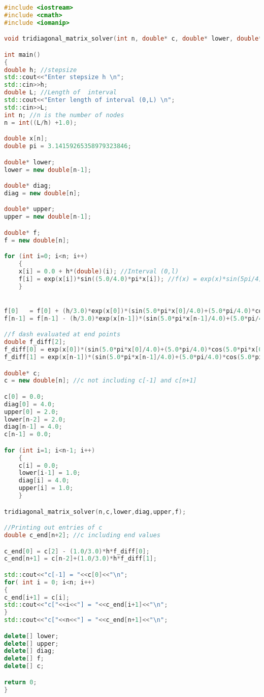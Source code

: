 \documentclass[a4paper,12pt,onecolumn,final]{article}
\begin{document}
\begin{lstlisting}[language=C++]
#include <iostream>
#include <cmath>
#include <iomanip>

void tridiagonal_matrix_solver(int n, double* c, double* lower, double* diag, double* upper, double* f);

int main()
{
double h; //stepsize
std::cout<<"Enter stepsize h \n";
std::cin>>h;
double L; //Length of  interval
std::cout<<"Enter length of interval (0,L) \n";
std::cin>>L;
int n; //n is the number of nodes
n = int((L/h) +1.0);

double x[n];
double pi = 3.14159265358979323846;

double* lower;
lower = new double[n-1];

double* diag;
diag = new double[n];

double* upper;
upper = new double[n-1];

double* f;
f = new double[n];

for (int i=0; i<n; i++)
    {
    x[i] = 0.0 + h*(double)(i); //Interval (0,l)
    f[i] = exp(x[i])*sin((5.0/4.0)*pi*x[i]); //f(x) = exp(x)*sin(5pi/4)x)
    }


f[0]   = f[0] + (h/3.0)*exp(x[0])*(sin(5.0*pi*x[0]/4.0)+(5.0*pi/4.0)*cos(5.0*pi*x[0]/4.0));
f[n-1] = f[n-1] - (h/3.0)*exp(x[n-1])*(sin(5.0*pi*x[n-1]/4.0)+(5.0*pi/4.0)*cos(5.0*pi*x[n-1]/4.0));

//f dash evaluated at end points
double f_diff[2];
f_diff[0] = exp(x[0])*(sin(5.0*pi*x[0]/4.0)+(5.0*pi/4.0)*cos(5.0*pi*x[0]/4.0));
f_diff[1] = exp(x[n-1])*(sin(5.0*pi*x[n-1]/4.0)+(5.0*pi/4.0)*cos(5.0*pi*x[n-1]/4.0));

double* c;
c = new double[n]; //c not including c[-1] and c[n+1]

c[0] = 0.0;
diag[0] = 4.0;
upper[0] = 2.0;
lower[n-2] = 2.0;
diag[n-1] = 4.0;
c[n-1] = 0.0;

for (int i=1; i<n-1; i++)
    {
    c[i] = 0.0;
    lower[i-1] = 1.0;
    diag[i] = 4.0;
    upper[i] = 1.0;
    }

tridiagonal_matrix_solver(n,c,lower,diag,upper,f);

//Printing out entries of c
double c_end[n+2]; //c including end values

c_end[0] = c[2] - (1.0/3.0)*h*f_diff[0];
c_end[n+1] = c[n-2]+(1.0/3.0)*h*f_diff[1];

std::cout<<"c[-1] = "<<c[0]<<"\n";
for( int i = 0; i<n; i++)
{
c_end[i+1] = c[i];
std::cout<<"c["<<i<<"] = "<<c_end[i+1]<<"\n";
}
std::cout<<"c["<<n<<"] = "<<c_end[n+1]<<"\n";

delete[] lower;
delete[] upper;
delete[] diag;
delete[] f;
delete[] c;

return 0;
}
\end{lstlisting}%
\end{document}
